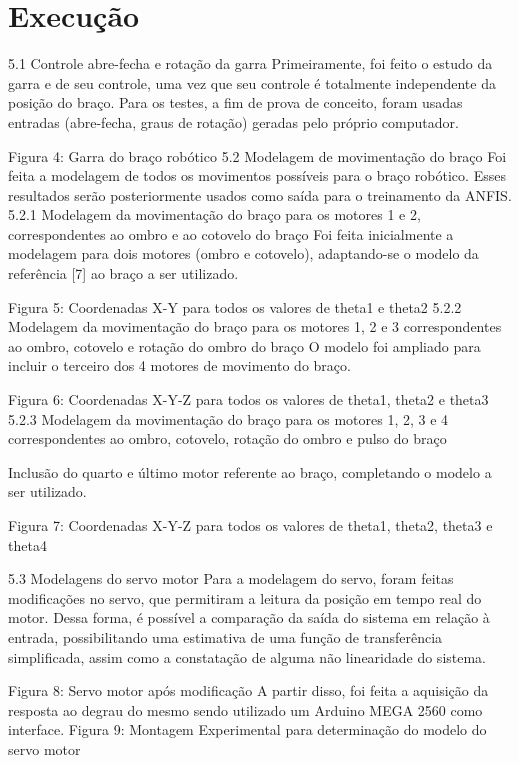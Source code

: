 	\chapter{Execução}\label{cap-execucao}
	
5.1	Controle abre-fecha e rotação da garra
Primeiramente, foi feito o estudo da garra e de seu controle, uma vez que seu controle é totalmente independente da posição do braço. Para os testes, a fim de prova de conceito, foram usadas entradas (abre-fecha, graus de rotação) geradas pelo próprio computador.


Figura 4: Garra do braço robótico
5.2	Modelagem de movimentação do braço
Foi feita a modelagem de todos os movimentos possíveis para o braço robótico. Esses resultados serão posteriormente usados como saída para o treinamento da ANFIS.
5.2.1	Modelagem da movimentação do braço para os motores 1 e 2, correspondentes ao ombro e ao cotovelo do braço
Foi feita inicialmente a modelagem para dois motores (ombro e cotovelo), adaptando-se o modelo da referência [7] ao braço a ser utilizado. 

Figura 5: Coordenadas X-Y para todos os valores de theta1 e theta2
5.2.2	Modelagem da movimentação do braço para os motores 1, 2 e 3 correspondentes ao ombro, cotovelo e rotação do ombro do braço
O modelo foi ampliado para incluir o terceiro dos 4 motores de movimento do braço.

Figura 6: Coordenadas X-Y-Z para todos os valores de theta1, theta2 e theta3
5.2.3	Modelagem da movimentação do braço para os motores 1, 2, 3 e 4 correspondentes ao ombro, cotovelo, rotação do ombro e pulso do braço

Inclusão do quarto e último motor referente ao braço, completando o modelo a ser utilizado.


Figura 7: Coordenadas X-Y-Z para todos os valores de theta1, theta2, theta3 e theta4

5.3	Modelagens do servo motor
Para a modelagem do servo, foram feitas modificações no servo, que permitiram a leitura da posição em tempo real do motor. Dessa forma, é possível a comparação da saída do sistema em relação à entrada, possibilitando uma estimativa de uma função de transferência simplificada, assim como a constatação de alguma não linearidade do sistema.

Figura 8: Servo motor após modificação
A partir disso, foi feita a aquisição da resposta ao degrau do mesmo sendo utilizado um Arduino MEGA 2560 como interface. 
Figura 9: Montagem Experimental para determinação do modelo do servo motor

